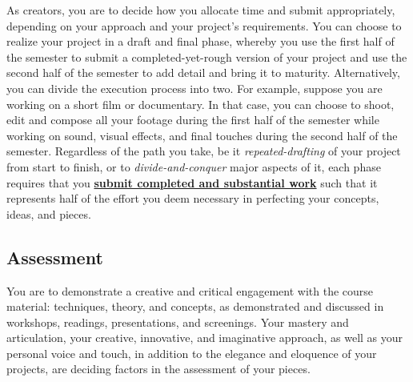 As creators, you are to decide how you allocate time and submit appropriately, depending on your approach and your project's requirements. You can choose to realize your project in a draft and final phase, whereby you use the first half of the semester to submit a completed-yet-rough version of your project and use the second half of the semester to add detail and bring it to maturity. Alternatively, you can divide the execution process into two. For example, suppose you are working on a short film or documentary. In that case, you can choose to shoot, edit and compose all your footage during the first half of the semester while working on sound, visual effects, and final touches during the second half of the semester. Regardless of the path you take, be it \emph{repeated-drafting} of your project from start to finish, or to \emph{divide-and-conquer} major aspects of it, each phase requires that you \ul{\textbf{submit completed and substantial work}} such that it represents half of the effort you deem necessary in perfecting your concepts, ideas, and pieces.

\subsection{Assessment}

You are to demonstrate a creative and critical engagement with the course material: techniques, theory, and concepts, as demonstrated and discussed in workshops, readings, presentations, and screenings.  Your mastery and articulation, your creative, innovative, and imaginative approach, as well as your personal voice and touch, in addition to the elegance and eloquence of your projects, are deciding factors in the assessment of your pieces.

